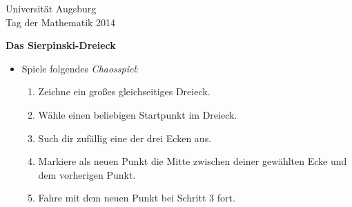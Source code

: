 \documentclass[a4paper,ngerman]{scrartcl}
\newcommand{\drawHere}{%
  \begin{center}%
    \fbox{\parbox[c][0.9\textwidth]{0.9\textwidth}{\ }}%
  \end{center}}
\newcommand{\header}{%
  \begin{raggedleft}
  \tiny Universität Augsburg \\
  Tag der Mathematik 2014 \par
  \end{raggedleft}}
\begin{document}
\newpage


\header

\begin{center}
  \Huge\bf
  Das Sierpinski-Dreieck
\end{center}

\vfill
\drawHere

\vfill
\Large

\renewcommand{\labelitemi}{$\blacktriangle$}

\begin{itemize}
  \item Spiele folgendes \emph{Chaosspiel}:
  \begin{enumerate}
    \item Zeichne ein großes gleichseitiges Dreieck.
    \item Wähle einen beliebigen Startpunkt im Dreieck.
    \item Such dir zufällig eine der drei Ecken aus.
    \item Markiere als neuen Punkt die Mitte zwischen deiner gewählten Ecke und \\ dem
    vorherigen Punkt.
    \item Fahre mit dem neuen Punkt bei Schritt 3 fort.
  \end{enumerate}
\end{itemize}
\end{document}
